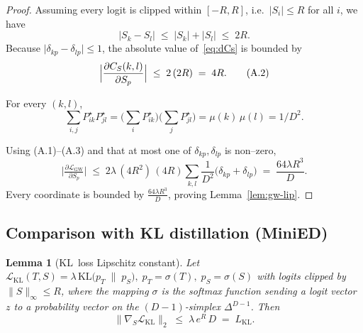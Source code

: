 \documentclass{article}
\newtheorem{lemma}{Lemma}
\begin{document}
\begin{proof}
Assuming every logit is clipped within $[-R,R]$, i.e.\
$\lvert S_{i}\rvert\le R$ for all $i$, we have
\[
  \lvert S_{k}-S_{l}\rvert
  \;\le\;
  \lvert S_{k}\rvert+\lvert S_{l}\rvert
  \;\le\; 2R .
\]
Because $\bigl|\delta_{kp}-\delta_{lp}\bigr|\le 1$, the absolute
value of~\eqref{eq:dCs} is bounded by
\begin{equation}
  \Bigl\lvert
    \frac{\partial C_{S}(k,l)}{\partial S_{p}}
  \Bigr\rvert
  \;\le\;
  2\,(2R)
  \;=\; 4R .
  \tag{A.2}
\end{equation}


For every \((k,l)\),
\begin{equation}
    \sum_{i,j} P^{\star}_{ik}P^{\star}_{jl}
  = \bigl(\sum_{i}P^{\star}_{ik}\bigr)
    \bigl(\sum_{j}P^{\star}_{jl}\bigr)
  = \mu(k)\,\mu(l) = 1/D^{2}.
  \tag{A.3}
\end{equation}

Using (A.1)–(A.3) and that at most one of
\(\delta_{kp},\delta_{lp}\) is non–zero,
\[
  \bigl|
  \tfrac{\partial\mathcal{L}_{\mathrm{GW}}}{\partial S_{p}}
  \bigr|
  \;\le\;
  2\lambda\,
  (4R^{2})\,(4R)\!
  \sum_{k,l} \!\frac{1}{D^{2}}
  \bigl(\delta_{kp}+\delta_{lp}\bigr)
  \;=\;
  \frac{64\lambda R^3}{D}  .
\]
Every coordinate is bounded by \(\frac{64\lambda R^3}{D}\), 
proving Lemma~\ref{lem:gw-lip}.
\end{proof}


\subsection{Comparison with KL distillation (MiniED)}

\begin{lemma}[KL~loss Lipschitz constant]
\label{lem:kl-lip}
Let
\(
  \mathcal{L}_{\mathrm{KL}}(T,S)
   =\lambda\,\mathrm{KL}\!\bigl(p_{T}\;\|\;p_{S}\bigr),
   \;
   p_{T}=\sigma(T),\;
   p_{S}=\sigma(S)
\)
with logits clipped by
$\lVert S\rVert_{\infty}\le R$, where the mapping $\sigma$ is the softmax function sending a logit vector
\(z\) to a probability vector on the $(D\!-\!1)$-simplex
\(\Delta^{D-1}\).
Then
\begin{equation}
  \bigl\lVert\nabla_{S}\mathcal{L}_{\mathrm{KL}}\bigr\rVert_{2}
  \;\le\;
  \lambda\,e^{R}\,D
  \;=\;L_{\mathrm{KL}} .
  \label{eq:kl-lip}
\end{equation}
\end{lemma}
\end{document}
